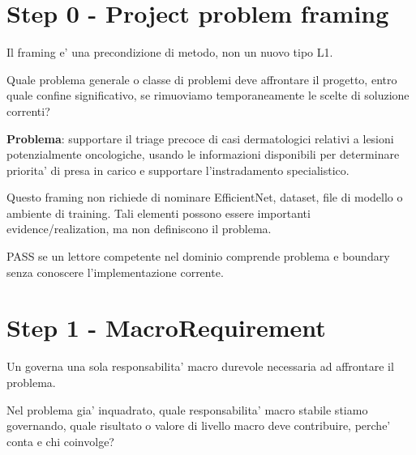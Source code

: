\documentclass[11pt,a4paper]{article}
\begin{document}
\section{Step 0 - Project problem framing}
\closedtag

Il framing e' una precondizione di metodo, non un nuovo tipo L1.

\begin{ddtacheck}[title={Domanda fondamentale}]
Quale problema generale o classe di problemi deve affrontare il progetto, entro quale confine significativo, se rimuoviamo temporaneamente le scelte di soluzione correnti?
\end{ddtacheck}

\begin{ddtaexample}[title={DermaTriage - framing prima della soluzione}]
\textbf{Problema}: supportare il triage precoce di casi dermatologici relativi a lesioni potenzialmente oncologiche, usando le informazioni disponibili per determinare priorita' di presa in carico e supportare l'instradamento specialistico.\par
Questo framing non richiede di nominare EfficientNet, dataset, file di modello o ambiente di training. Tali elementi possono essere importanti evidence/realization, ma non definiscono il problema.
\end{ddtaexample}

\begin{ddtacheck}[title={Gate D0}]
PASS se un lettore competente nel dominio comprende problema e boundary senza conoscere l'implementazione corrente.
\end{ddtacheck}

\section{Step 1 - MacroRequirement}
\closedtag

Un \MR{} governa una sola responsabilita' macro durevole necessaria ad affrontare il problema.

\begin{ddtacheck}[title={Domanda fondamentale}]
Nel problema gia' inquadrato, quale responsabilita' macro stabile stiamo governando, quale risultato o valore di livello macro deve contribuire, perche' conta e chi coinvolge?
\end{ddtacheck}
\end{document}
